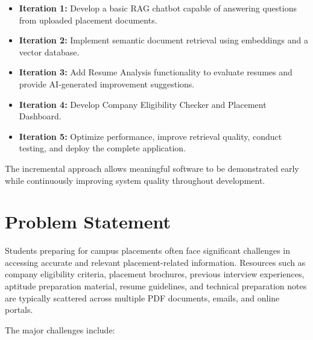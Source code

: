 \documentclass[11pt]{article}
\begin{document}
\begin{itemize}

\item \textbf{Iteration 1:}
Develop a basic RAG chatbot capable of answering questions from uploaded placement documents.

\item \textbf{Iteration 2:}
Implement semantic document retrieval using embeddings and a vector database.

\item \textbf{Iteration 3:}
Add Resume Analysis functionality to evaluate resumes and provide AI-generated improvement suggestions.

\item \textbf{Iteration 4:}
Develop Company Eligibility Checker and Placement Dashboard.

\item \textbf{Iteration 5:}
Optimize performance, improve retrieval quality, conduct testing, and deploy the complete application.

\end{itemize}

The incremental approach allows meaningful software to be demonstrated early while continuously improving system quality throughout development.
\section{Problem Statement}

Students preparing for campus placements often face significant challenges in accessing accurate and relevant placement-related information. Resources such as company eligibility criteria, placement brochures, previous interview experiences, aptitude preparation material, resume guidelines, and technical preparation notes are typically scattered across multiple PDF documents, emails, and online portals.

The major challenges include:
\end{document}
